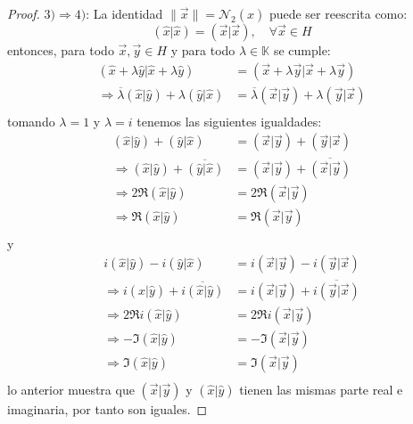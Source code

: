 \documentclass[12pt]{report}
\newcounter{it}
\theoremstyle{largebreak}
\newcommand\norm[1]{\ensuremath{\|#1\|}}
\newcommand\pint[2]{\ensuremath{\left(#1\big| #2\right)}}
\newcommand\conj[1]{\ensuremath{\overline{#1}}}
\newcommand{\N}[2]{\ensuremath{\mathcal{N}_{#1}\left(#2\right)}}
\begin{document}
\begin{proof}
        $3)\Rightarrow 4)$: La identidad $\norm{\vec{x}}=\N{2}{\hat{x}}$ puede ser reescrita como:
        \begin{equation*}
            \pint{\hat{x}}{\hat{x}}=\pint{\vec{x}}{\vec{x}},\quad\forall\vec{x}\in H
        \end{equation*}
        entonces, para todo $\vec{x},\vec{y}\in H$ y para todo $\lambda\in\mathbb{K}$ se cumple:
        \begin{equation*}
            \begin{split}
                \pint{\hat{x}+\lambda\hat{y}}{\hat{x}+\lambda\hat{y}}&=\pint{\vec{x}+\lambda\vec{y}}{\vec{x}+\lambda\vec{y}}\\
                \Rightarrow \conj{\lambda}\pint{\hat{x}}{\hat{y}}+\lambda\pint{\hat{y}}{\hat{x}} &=\conj{\lambda}\pint{\vec{x}}{\vec{y}}+\lambda\pint{\vec{y}}{\vec{x}} \\
            \end{split}
        \end{equation*}
        tomando $\lambda=1$ y $\lambda=i$ tenemos las siguientes igualdades:
        \begin{equation*}
            \begin{split}
                \pint{\hat{x}}{\hat{y}}+\pint{\hat{y}}{\hat{x}} &=\pint{\vec{x}}{\vec{y}}+\pint{\vec{y}}{\vec{x}}\\
                \Rightarrow \pint{\hat{x}}{\hat{y}}+\conj{\pint{\hat{y}}{\hat{x}}}&=\pint{\vec{x}}{\vec{y}}+\conj{\pint{\vec{x}}{\vec{y}}} \\
                \Rightarrow 2\Re\pint{\hat{x}}{\hat{y}}&=2\Re\pint{\vec{x}}{\vec{y}}\\
                \Rightarrow \Re\pint{\hat{x}}{\hat{y}}&=\Re\pint{\vec{x}}{\vec{y}}\\
            \end{split}
        \end{equation*}
        y
        \begin{equation*}
            \begin{split}
                i\pint{\hat{x}}{\hat{y}}-i\pint{\hat{y}}{\hat{x}}&=i\pint{\vec{x}}{\vec{y}}-i\pint{\vec{y}}{\vec{x}}\\
                \Rightarrow i\pint{\hat{x}}{\hat{y}}+\conj{i\pint{\hat{x}}{\hat{y}}}&=i\pint{\vec{x}}{\vec{y}}+\conj{i\pint{\vec{y}}{\vec{x}}}\\
                \Rightarrow 2\Re i\pint{\hat{x}}{\hat{y}} &=2\Re i\pint{\vec{x}}{\vec{y}} \\
                \Rightarrow -\Im \pint{\hat{x}}{\hat{y}} &=-\Im \pint{\vec{x}}{\vec{y}} \\
                \Rightarrow \Im \pint{\hat{x}}{\hat{y}} &=\Im \pint{\vec{x}}{\vec{y}} \\
            \end{split}
        \end{equation*}
        lo anterior muestra que $\pint{\vec{x}}{\vec{y}}$ y $\pint{\hat{x}}{\hat{y}}$ tienen las mismas parte real e imaginaria, por tanto son iguales.


\end{proof}
\end{document}
